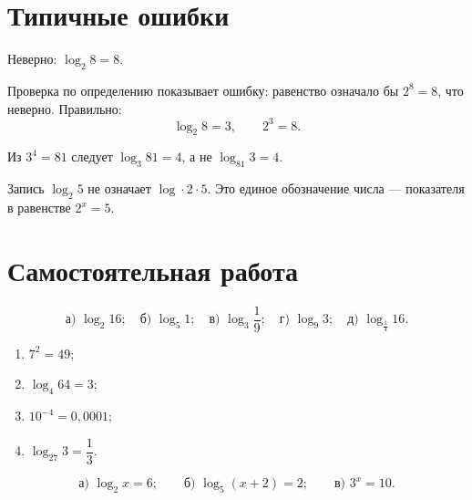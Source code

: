 \section{Типичные ошибки}

\begin{warningbox}
  Неверно: \(\log_2 8=8\).

  Проверка по определению показывает ошибку: равенство означало бы
  \(2^8=8\), что неверно. Правильно:
  \[
    \log_2 8=3,
    \qquad 2^3=8.
  \]
\end{warningbox}

\begin{warningbox}
  Из \(3^4=81\) следует \(\log_3 81=4\), а не \(\log_{81}3=4\).
\end{warningbox}

\begin{warningbox}
  Запись \(\log_2 5\) не означает \(\log\cdot2\cdot5\). Это единое
  обозначение числа --- показателя в равенстве \(2^x=5\).
\end{warningbox}

\section{Самостоятельная работа}

\begin{practicebox}
  \[
    \text{а) }\log_2 16;
    \quad
    \text{б) }\log_5 1;
    \quad
    \text{в) }\log_3\frac19;
    \quad
    \text{г) }\log_9 3;
    \quad
    \text{д) }\log_{\frac14}16.
  \]
\end{practicebox}

\begin{practicebox}
  \begin{enumerate}
    \item \(7^2=49\);
    \item \(\log_4 64=3\);
    \item \(10^{-4}=0{,}0001\);
    \item \(\log_{27}3=\dfrac13\).
  \end{enumerate}
\end{practicebox}

\begin{practicebox}
  \[
    \text{а) }\log_2 x=6;
    \qquad
    \text{б) }\log_5(x+2)=2;
    \qquad
    \text{в) }3^x=10.
  \]
\end{practicebox}

